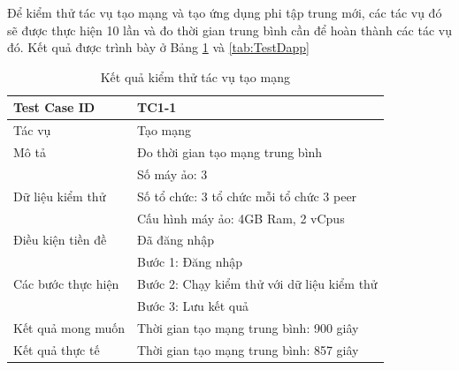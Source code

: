\documentclass[../DoAn.tex]{subfiles}
\begin{document}
Để kiểm thử tác vụ tạo mạng và tạo ứng dụng phi tập trung mới, các tác vụ đó sẽ được thực hiện 10 lần và đo thời gian trung bình cần để hoàn thành các tác vụ đó. Kết quả được trình bày ở Bảng \ref{tab:TestNetwork} và \ref{tab:TestDapp}

\begingroup
\renewcommand{\arraystretch}{1.5} %
\begin{table}[H]
    \centering
    \def\arraystretch{1.5}
    \caption{Kết quả kiểm thử tác vụ tạo mạng}
    \label{tab:TestNetwork}
    \begin{tabular}{|p{}|p{}|}
        \hline
        Test Case ID                                       & TC1-1                                      \\ \hline
        Tác vụ                                             & Tạo mạng                                   \\ \hline
        Mô tả                                              & Đo thời gian tạo mạng trung bình           \\ \hline
        \multirow[t]{3}{0.3\textwidth}{Dữ liệu kiểm thử}   & Số máy ảo: 3                               \\
                                                           & Số tổ chức: 3 tổ chức mỗi tổ chức 3 peer   \\
                                                           & Cấu hình máy ảo: 4GB Ram, 2 vCpus          \\ \hline
        Điều kiện tiền đề                                  & Đã đăng nhập                               \\ \hline
        \multirow[t]{3}{0.3\textwidth}{Các bước thực hiện} & Bước 1: Đăng nhập                          \\
                                                           & Bước 2: Chạy kiểm thử với dữ liệu kiểm thử \\
                                                           & Bước 3: Lưu kết quả                        \\ \hline
        Kết quả mong muốn                                  & Thời gian tạo mạng trung bình: 900 giây    \\ \hline
        Kết quả thực tế                                    & Thời gian tạo mạng trung bình: 857 giây    \\ \hline
    \end{tabular}
\end{table}
\endgroup
\end{document}
